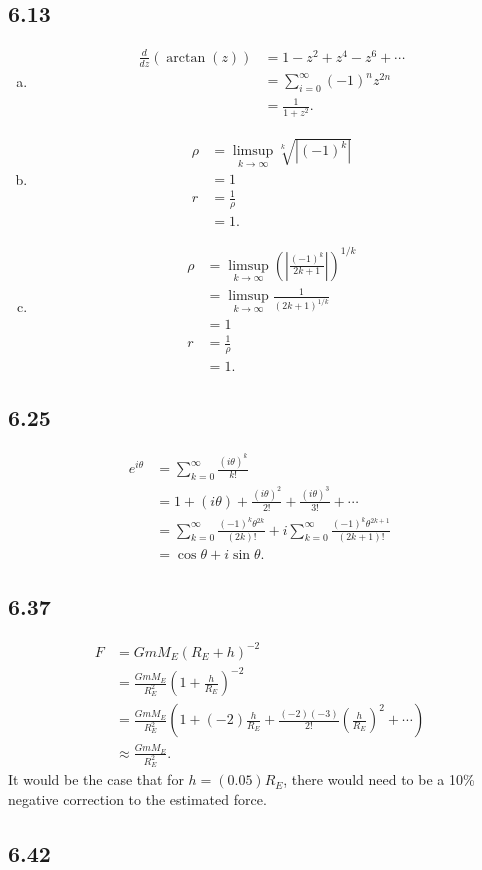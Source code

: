 \documentclass[10pt]{mypackage}
\begin{document}
\subsection{6.13}%
\begin{enumerate}[(a)]
  \item 
    \begin{align*}
      \frac{d}{dz}\left(\arctan(z)\right) &= 1 - z^2 + z^4 - z^6 + \cdots\\
                                          &= \sum_{i=0}^{\infty}(-1)^{n}z^{2n}\\
                                          &= \frac{1}{1+z^2}.
    \end{align*}
  \item 
    \begin{align*}
      \rho &= \limsup_{k\rightarrow\infty}\sqrt[k]{\left|\left(-1\right)^k\right|}\\
           &= 1\\
      r &= \frac{1}{\rho}\\
        &= 1.
    \end{align*}
  \item 
    \begin{align*}
      \rho &= \limsup_{k\rightarrow\infty}\left(\left|\frac{(-1)^k}{2k+1}\right|\right)^{1/k}\\
           &= \limsup_{k\rightarrow\infty}\frac{1}{\left(2k+1\right)^{1/k}}\\
           &= 1\\
      r &= \frac{1}{\rho}\\
        &= 1.
    \end{align*}
\end{enumerate}
\subsection{6.25}%
\begin{align*}
  e^{i\theta} &= \sum_{k=0}^{\infty}\frac{\left(i\theta\right)^{k}}{k!}\\
              &= 1 + \left(i\theta\right) + \frac{\left(i\theta\right)^2}{2!} + \frac{\left(i\theta\right)^3}{3!} + \cdots\\
              &= \sum_{k=0}^{\infty}\frac{(-1)^{k}\theta^{2k}}{\left(2k\right)!} + i\sum_{k=0}^{\infty}\frac{\left(-1\right)^{k}\theta^{2k+1}}{\left(2k+1\right)!}\\
              &= \cos\theta + i\sin\theta.
\end{align*}
\subsection{6.37}%
\begin{align*}
  F &= GmM_E\left(R_E + h\right)^{-2}\\
    &= \frac{GmM_E}{R_E^2}\left(1 + \frac{h}{R_E}\right)^{-2}\\
    &= \frac{GmM_E}{R_E^2}\left(1 + (-2)\frac{h}{R_E} + \frac{(-2)(-3)}{2!}\left(\frac{h}{R_E}\right)^2 + \cdots \right)\\
    &\approx \frac{GmM_E}{R_E^2}.
\end{align*}
It would be the case that for $h = \left(0.05\right)R_E$, there would need to be a 10\% negative correction to the estimated force.
\subsection{6.42}%
\end{document}
